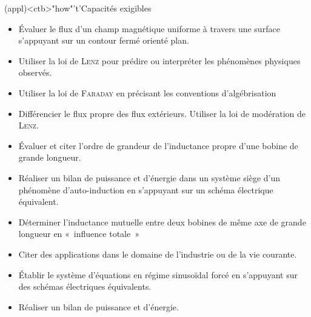 \documentclass[../../main/main.tex]{subfiles}
\begin{document}
\begin{tcn}[sidebyside, fontupper=\small, fontlower=\small](appl)<ctb>"how"'t'{Capacités exigibles}
	\begin{itemize}[label=\rcheck]
		\item Évaluer le flux d'un champ magnétique uniforme à travers une surface
		      s'appuyant sur un contour fermé orienté plan.

		\item Utiliser la loi de \textsc{Lenz} pour prédire ou interpréter les
		      phénomènes physiques observés.

		\item Utiliser la loi de \textsc{Faraday} en précisant les conventions
		      d'algébrisation

		\item Différencier le flux propre des flux extérieurs. Utiliser la loi de
		      modération de \textsc{Lenz}.

		\item Évaluer et citer l'ordre de grandeur de l'inductance propre d'une
		      bobine de grande longueur.
	\end{itemize}
	\tcblower
	\begin{itemize}[label=\rcheck]
		\item Réaliser un bilan de puissance et d'énergie dans un système siège d'un
		      phénomène d'auto-induction en s'appuyant sur un schéma électrique
		      équivalent.

		\item Déterminer l'inductance mutuelle entre deux bobines de même axe de
		      grande longueur en «~influence totale~»

		\item Citer des applications dans le domaine de l'industrie ou de la vie
		      courante.

		\item Établir le système d'équations en régime sinusoïdal forcé en
		      s'appuyant sur des schémas électriques équivalents.

		\item Réaliser un bilan de puissance et d'énergie.
	\end{itemize}
\end{tcn}


\vspace*{\fill}

\newpage
\end{document}
